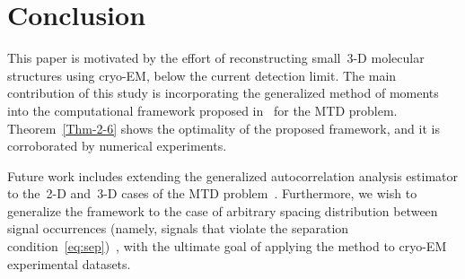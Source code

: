 \documentclass{article}
\begin{document}
\section{Conclusion}
\label{sec:conclusion}
This paper is motivated by the effort of reconstructing small~\mbox{3-D} molecular structures using \mbox{cryo-EM}, below the current detection limit. The main contribution of this study is incorporating the generalized method of moments into the computational framework proposed in~\cite{bendory2018toward} for the MTD problem. {Theorem~\ref{Thm-2-6} shows the optimality of the proposed framework, and it is} corroborated by numerical experiments.

Future work includes extending the generalized autocorrelation analysis estimator to the~\mbox{2-D} and~\mbox{3-D} cases of the MTD problem~\cite{bendory2018toward}. Furthermore, we wish to generalize the framework to the case of arbitrary spacing distribution between signal occurrences (namely, signals that violate the separation condition~\eqref{eq:sep})~\cite{lan2020multi,kreymer2021two}, with the {ultimate} goal of applying the method to \mbox{cryo-EM} {experimental} datasets.

\vfill
\newpage



\end{document}
